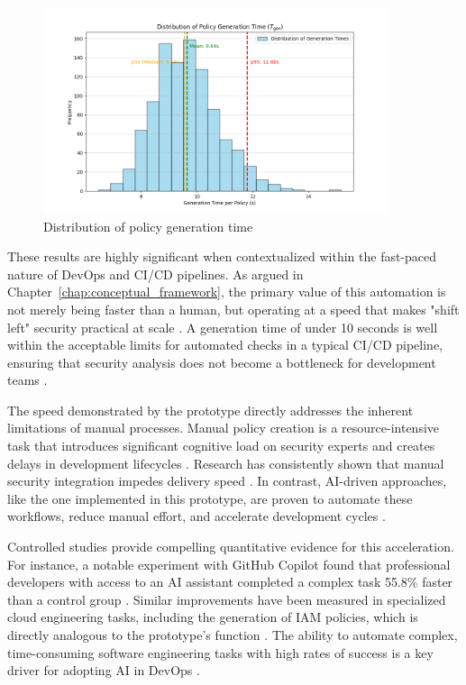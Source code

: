 \begin{figure}[htbp]
	\centering
	\includegraphics[width=0.9\textwidth]{Figures/speed_distribution.png}
	\caption{Distribution of policy generation time}\label{fig:speed-distribution}
\end{figure}

These results are highly significant when contextualized within the fast-paced nature of DevOps and CI/CD pipelines. As argued in Chapter~\ref{chap:conceptual_framework}, the primary value of this automation is not merely being faster than a human, but operating at a speed that makes "shift left" security practical at scale \cite{vaidya_devsecops_2024}. A generation time of under 10 seconds is well within the acceptable limits for automated checks in a typical CI/CD pipeline, ensuring that security analysis does not become a bottleneck for development teams \cite{li_automated_2024}.

The speed demonstrated by the prototype directly addresses the inherent limitations of manual processes. Manual policy creation is a resource-intensive task that introduces significant cognitive load on security experts and creates delays in development lifecycles \cite{gunathilaka_context-aware_2025, mahboob_future_2024}. Research has consistently shown that manual security integration impedes delivery speed \cite{gunathilaka_context-aware_2025, mahboob_future_2024}. In contrast, AI-driven approaches, like the one implemented in this prototype, are proven to automate these workflows, reduce manual effort, and accelerate development cycles \cite{fu_ai_2025}.

Controlled studies provide compelling quantitative evidence for this acceleration. For instance, a notable experiment with GitHub Copilot found that professional developers with access to an AI assistant completed a complex task 55.8\% faster than a control group \cite{peng_impact_2023}. Similar improvements have been measured in specialized cloud engineering tasks, including the generation of IAM policies, which is directly analogous to the prototype's function \cite{kesireddy_copilot_2025}. The ability to automate complex, time-consuming software engineering tasks with high rates of success is a key driver for adopting AI in DevOps \cite{tufano_autodev_2024}.

